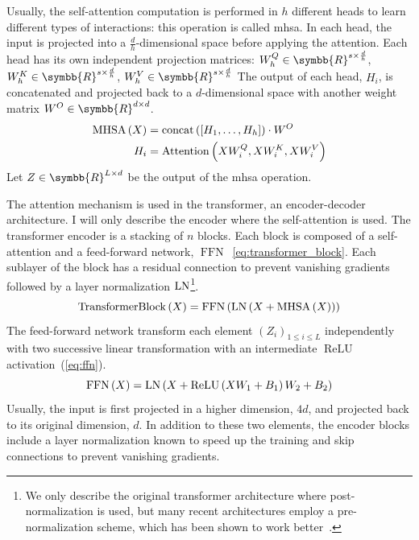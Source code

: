 \documentclass[../main.tex]{subfiles}
\begin{document}
		Usually, the self-attention computation is performed in \(h\) different heads to learn different types of interactions: this operation is called \gls{mhsa}.
		In each head, the input is projected into a \(\frac{d}{h}\)-dimensional space before applying the attention.
		Each head has its own independent projection matrices: \(W^Q_h \in \symbb{R}^{s \times \frac{d}{h}}\), \(W^K_h \in \symbb{R}^{s \times \frac{d}{h}}\), \(W^V_h \in \symbb{R}^{s \times \frac{d}{h}}\)
		The output of each head, \(H_i\), is concatenated and projected back to a \(d\)-dimensional space with another weight matrix \(W^O \in \symbb{R}^{d \times d}\).
		\begin{align}
			\operatorname{MHSA}\left(X\right) & = \operatorname{concat}\left(\left[H_1, \ldots, H_h \right] \right)\cdot W^O \\
			H_i                 & = \operatorname{Attention}\left(XW^Q_i, XW^K_i, XW^V_i\right)
		\end{align}
		Let \(Z \in \symbb{R}^{L \times d}\) be the output of the \gls{mhsa} operation.

		The attention mechanism is used in the transformer, an encoder-decoder architecture.
		I will only describe the encoder where the self-attention is used.
		The transformer encoder is a stacking of \(n\) blocks.
		Each block is composed of a self-attention and a feed-forward network, \(\operatorname{FFN}\)~\cref{eq:transformer_block}.
		Each sublayer of the block has a residual connection to prevent vanishing gradients followed by a layer normalization \(\operatorname{LN}\)\footnote{We only describe the original transformer architecture where post-normalization is used, but many recent architectures employ a pre-normalization scheme, which has been shown to work better~\cite{TransformerpreLN}.}.
		\begin{equation}
			\operatorname{TransformerBlock}\left(X\right) = \operatorname{FFN}\left(\LN\left(X + \MHSA\left(X\right)\right)\right)\label{eq:transformer_block}
		\end{equation}
		The feed-forward network transform each element \({\left(Z_i\right)}_{1 \leq i \leq L}\) independently with two successive linear transformation with an intermediate \(\operatorname{ReLU}\) activation~(\cref{eq:ffn}).
		\begin{equation}%
			\operatorname{FFN}\left(X\right) = \LN\left( X + \operatorname{ReLU}\left(XW_1 + B_1\right)W_2 + B_2\right) \label{eq:ffn}
		\end{equation}
		Usually, the input is first projected in a higher dimension, \(4d\), and projected back to its original dimension, \(d\).
		In addition to these two elements, the encoder blocks include a layer normalization known to speed up the training and skip connections to prevent vanishing gradients.
\end{document}

